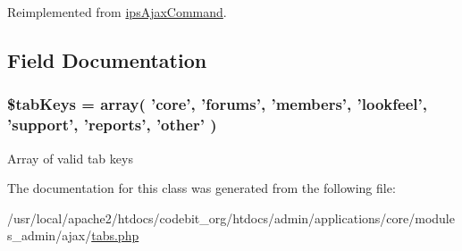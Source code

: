 Reimplemented from \hyperlink{classips_ajax_command_afbc4e912a0604b94d47d66744c64d8ba}{ips\-Ajax\-Command}.



\subsection{Field Documentation}
\hypertarget{classadmin__core__ajax__tabs_a2f88bfd5e3922bac4cd227cf52415b60}{
\subsubsection[{\$tab\-Keys}]{\setlength{\rightskip}{0pt plus 5cm}\$tab\-Keys = array( 'core', 'forums', 'members', 'lookfeel', 'support', 'reports', 'other' )\hspace{0.3cm}{\ttfamily [protected]}}}\label{classadmin__core__ajax__tabs_a2f88bfd5e3922bac4cd227cf52415b60}
Array of valid tab keys 

The documentation for this class was generated from the following file\-:\begin{DoxyCompactItemize}
\item 
/usr/local/apache2/htdocs/codebit\-\_\-org/htdocs/admin/applications/core/modules\-\_\-admin/ajax/\hyperlink{tabs_8php}{tabs.\-php}\end{DoxyCompactItemize}

